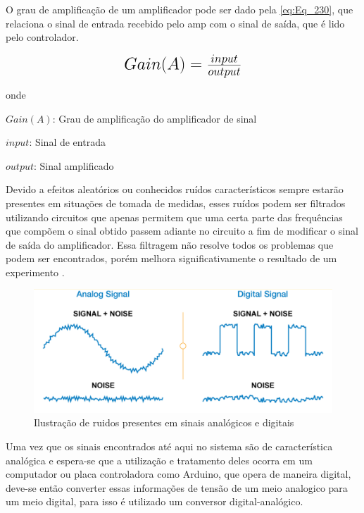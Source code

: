 O grau de amplificação de um amplificador pode ser dado pela \autoref{eq:Eq_230}, que relaciona o sinal de entrada recebido pelo amp com o sinal de saída,
que é lido pelo controlador.

\begin{equation}\label{eq:Eq_230}%
\mbox{\fontsize{17.28}{21.6}\selectfont\( %
Gain(A) = \frac{input}{output}
\)} %
\end{equation}

onde

$Gain (A)$: Grau de amplificação do amplificador de sinal

$input$: Sinal de entrada

$output$: Sinal amplificado

\hfill

Devido a efeitos aleatórios ou conhecidos ruídos característicos sempre estarão presentes em situações de tomada de medidas, esses ruídos podem ser filtrados utilizando
circuitos que apenas permitem que uma certa parte das frequências que compõem o sinal obtido passem adiante no circuito a fim de modificar o sinal de saída do amplificador.
Essa filtragem não resolve todos os problemas que podem ser encontrados, porém melhora significativamente o resultado de um experimento \autocite{Hollman2011}.

\begin{figure}[htb]
	\caption{\label{fig:1110} Ilustração de ruidos presentes em sinais analógicos e digitais}
	\begin{center}
		\includegraphics[width=\textwidth]{pictures/1110.png}
	\end{center}
\end{figure}

Uma vez que os sinais encontrados até aqui no sistema são de característica analógica e espera-se que a utilização e tratamento deles ocorra em um computador ou placa
controladora como Arduino, que opera de maneira digital, deve-se então converter essas informações de tensão de um meio analogico para um meio digital, para isso é utilizado
um conversor digital-analógico.


